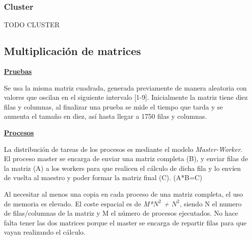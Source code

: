 		
		\newpage
		\subsubsection{Cluster}
		
		
		\color{blue} TODO CLUSTER
		
		\color{black}

		\newpage





	\subsection{Multiplicación de matrices}
	
	\begin{flushleft}
	\begin{mdframed}[roundcorner=5pt]	
	
		\textbf{\underline{Pruebas}}
		\vspace{0.1cm}
	
		\scriptsize	
		Se usa la misma matriz cuadrada, generada previamente de manera aleatoria con valores que oscilan en el siguiente intervalo [1-9]. Inicialmente la matriz tiene diez filas y columnas, al finalizar una prueba se mide el tiempo que tarda y se aumenta el tamaño en diez, así hasta llegar a 1750 filas y columnas.\\		
		
	
		\normalsize
		
		\textbf{\underline{Procesos}}
		
		\vspace{0.1cm}
		
		\scriptsize	
		La distribución de tareas de los procesos es mediante el modelo \textit{Master-Worker}. El proceso master se encarga de enviar una matriz completa (B), y enviar filas de la matriz (A) a los workers para que realicen el cálculo de dicha fila y lo envíen de vuelta al maestro y poder formar la matriz final (C). (A*B=C)
	
	\end{mdframed}
	\end{flushleft}		
	
		Al necesitar al menos una copia en cada proceso de una matriz completa, el uso de memoria es elevado. El  coste espacial es de \textit{M*\(N^{2}\) + \(N^{2}\)}, siendo N el numero de filas/columnas de la matriz y M el número de procesos ejecutados. No hace falta tener las dos matrices porque el master se encarga de repartir filas para que vayan realizando el cálculo.
		
